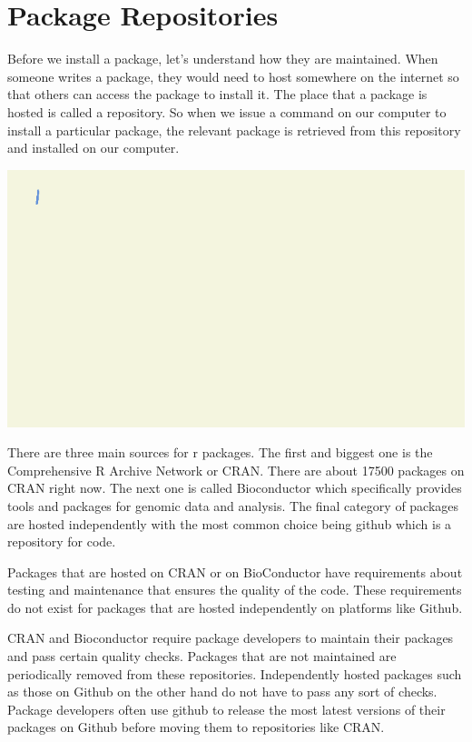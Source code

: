 \documentclass[
]{book}
\begin{document}
\hypertarget{package-repositories}{%
\section{Package Repositories}\label{package-repositories}}

Before we install a package, let's understand how they are maintained. When someone writes a package, they would need to host somewhere on the internet so that others can access the package to install it. The place that a package is hosted is called a repository. So when we issue a command on our computer to install a particular package, the relevant package is retrieved from this repository and installed on our computer.

\includegraphics{assets/packages/gifs/repo_concept.gif}

There are three main sources for r packages. The first and biggest one is the Comprehensive R Archive Network or CRAN. There are about 17500 packages on CRAN right now. The next one is called Bioconductor which specifically provides tools and packages for genomic data and analysis. The final category of packages are hosted independently with the most common choice being github which is a repository for code.

Packages that are hosted on CRAN or on BioConductor have requirements about testing and maintenance that ensures the quality of the code. These requirements do not exist for packages that are hosted independently on platforms like Github.

CRAN and Bioconductor require package developers to maintain their packages and pass certain quality checks. Packages that are not maintained are periodically removed from these repositories. Independently hosted packages such as those on Github on the other hand do not have to pass any sort of checks. Package developers often use github to release the most latest versions of their packages on Github before moving them to repositories like CRAN.
\end{document}
